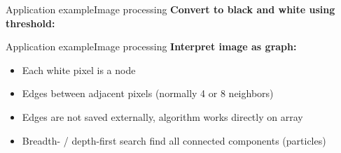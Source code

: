 \begin{frame}{Application example}{Image processing}
  \textbf{Convert to black and white using threshold:}\\
  \begin{center}
    \begin{adjustbox}{width=0.8\linewidth}
      
    \end{adjustbox}
  \end{center}
\end{frame}


\begin{frame}{Application example}{Image processing}
  \textbf{Interpret image as graph:}
  \begin{itemize}
    \item<2->
      Each white pixel is a node
    \item<3->
      Edges between adjacent pixels (normally 4 or 8 neighbors)
    \item<4->
      Edges are not saved externally,
      algorithm works directly on array
    \item<5->
      Breadth- / depth-first search find all connected components (particles)
  \end{itemize}
\end{frame}


